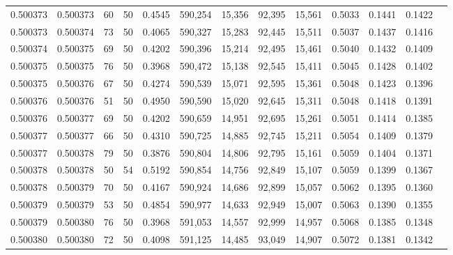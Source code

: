 \begin{tabular}{rrrrrrrrrrrrr}
0.500373 & 0.500373 &    60 &  50 &                                     0.4545 & 590,254 &  15,356 &  92,395 &  15,561 & 0.5033 & 0.1441 & 0.1422 \\
0.500373 & 0.500374 &    73 &  50 &                                     0.4065 & 590,327 &  15,283 &  92,445 &  15,511 & 0.5037 & 0.1437 & 0.1416 \\
0.500374 & 0.500375 &    69 &  50 &                                     0.4202 & 590,396 &  15,214 &  92,495 &  15,461 & 0.5040 & 0.1432 & 0.1409 \\
0.500375 & 0.500375 &    76 &  50 &                                     0.3968 & 590,472 &  15,138 &  92,545 &  15,411 & 0.5045 & 0.1428 & 0.1402 \\
0.500375 & 0.500376 &    67 &  50 &                                     0.4274 & 590,539 &  15,071 &  92,595 &  15,361 & 0.5048 & 0.1423 & 0.1396 \\
0.500376 & 0.500376 &    51 &  50 &                                     0.4950 & 590,590 &  15,020 &  92,645 &  15,311 & 0.5048 & 0.1418 & 0.1391 \\
0.500376 & 0.500377 &    69 &  50 &                                     0.4202 & 590,659 &  14,951 &  92,695 &  15,261 & 0.5051 & 0.1414 & 0.1385 \\
0.500377 & 0.500377 &    66 &  50 &                                     0.4310 & 590,725 &  14,885 &  92,745 &  15,211 & 0.5054 & 0.1409 & 0.1379 \\
0.500377 & 0.500378 &    79 &  50 &                                     0.3876 & 590,804 &  14,806 &  92,795 &  15,161 & 0.5059 & 0.1404 & 0.1371 \\
0.500378 & 0.500378 &    50 &  54 &                                     0.5192 & 590,854 &  14,756 &  92,849 &  15,107 & 0.5059 & 0.1399 & 0.1367 \\
0.500378 & 0.500379 &    70 &  50 &                                     0.4167 & 590,924 &  14,686 &  92,899 &  15,057 & 0.5062 & 0.1395 & 0.1360 \\
0.500379 & 0.500379 &    53 &  50 &                                     0.4854 & 590,977 &  14,633 &  92,949 &  15,007 & 0.5063 & 0.1390 & 0.1355 \\
0.500379 & 0.500380 &    76 &  50 &                                     0.3968 & 591,053 &  14,557 &  92,999 &  14,957 & 0.5068 & 0.1385 & 0.1348 \\
0.500380 & 0.500380 &    72 &  50 &                                     0.4098 & 591,125 &  14,485 &  93,049 &  14,907 & 0.5072 & 0.1381 & 0.1342 \\

\end{tabular}
